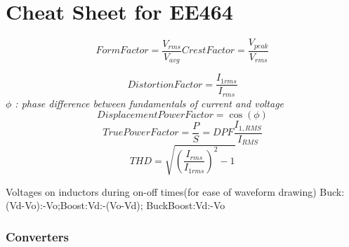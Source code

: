 \documentclass[twocolumn, ]{article}
\begin{document}
\section*{\small Cheat Sheet for EE464}
\small \begin{equation*}
Form Factor=\frac{V_{rms}}{V_{avg}}
Crest Factor=\frac{V_{peak}}{V_{rms}}
\end{equation*}

\begin{equation*}
Distortion Factor=\frac{I_{1rms}}{I_{rms}}
\end{equation*}
\textit{$\phi$ : phase difference between fundamentals of current and voltage}
\begin{equation*}
Displacement Power Factor=\cos(\phi)
\end{equation*}
\begin{equation*}
True Power Factor=\frac{P}{S}=DPF \frac{I_{1,RMS}}{I_{RMS}}
\end{equation*}
\begin{equation*}
THD=\sqrt{(\frac{I_{rms}}{I_{1rms}})^2-1}
\end{equation*}

Voltages on inductors during on-off times(for ease of waveform drawing) Buck:(Vd-Vo):-Vo;Boost:Vd:-(Vo-Vd); BuckBoost:Vd:-Vo



\subsubsection*{Converters}
\end{document}

